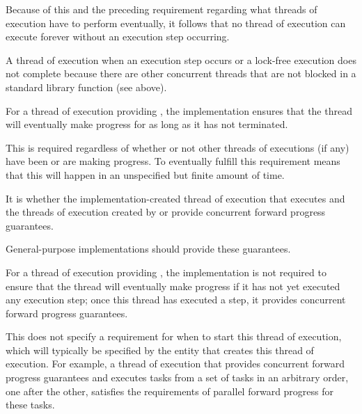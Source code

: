 \pnum
\begin{note}
Because of this and the preceding requirement regarding what threads of execution
have to perform eventually, it follows that no thread of execution can execute
forever without an execution step occurring.
\end{note}

\pnum
A thread of execution 
when an execution step occurs or a
lock-free execution does not complete because there are other concurrent threads
that are not blocked in a standard library function (see above).

\pnum
{}%
For a thread of execution providing ,
the implementation ensures that the thread will eventually make progress for as
long as it has not terminated.
\begin{note}
This is required regardless of whether or not other threads of executions (if any)
have been or are making progress. To eventually fulfill this requirement means that
this will happen in an unspecified but finite amount of time.
\end{note}

\pnum
It is  whether the
implementation-created thread of execution that executes
 and the threads of execution created by
or 
provide concurrent forward progress guarantees.
\begin{note}
General-purpose implementations should provide these guarantees.
\end{note}

\pnum
{}%
For a thread of execution providing ,
the implementation is not required to ensure that the thread will eventually make
progress if it has not yet executed any execution step; once this thread has
executed a step, it provides concurrent forward progress guarantees.

\pnum
\begin{note}
This does not specify a requirement for when to start this thread of execution,
which will typically be specified by the entity that creates this thread of
execution. For example, a thread of execution that provides concurrent forward
progress guarantees and executes tasks from a set of tasks in an arbitrary order,
one after the other, satisfies the requirements of parallel forward progress for
these tasks.
\end{note}

